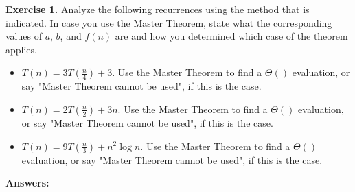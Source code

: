 \documentclass[11pt]{article}
\begin{document}
\textbf{Exercise 1.}  Analyze the following recurrences using the method that is indicated. In case you use the Master Theorem, state what the corresponding values of $a$, $b$, and $f(n)$ are and how
you determined which case of the theorem applies. 

\begin{itemize}
\item  $T(n) = 3 T\left(\frac{n}{4}\right) + 3$. Use the Master Theorem to find a $\Theta()$ evaluation, or say "Master Theorem cannot be used", if this is the case.
\item  $T(n) = 2 T\left(\frac{n}{2}\right) + 3n$. Use the Master Theorem to find a $\Theta()$ evaluation, or say "Master Theorem cannot be used", if this is the case.
\item  $T(n) = 9 T\left(\frac{n}{3}\right) + n^2 \log n $. Use the Master Theorem to find a $\Theta()$ evaluation, or say "Master Theorem cannot be used", if this is the case.
\end{itemize}

\bigskip
\textbf{Answers:}
\end{document}

